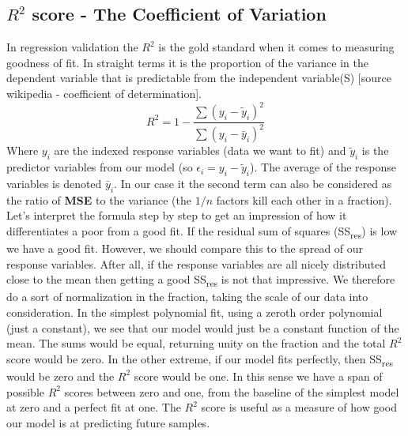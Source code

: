 \subsection{$R^2$ score - The Coefficient of Variation}
In regression validation the $R^2$ is the gold standard when it comes to measuring goodness of fit. In straight terms it is the proportion of the variance in the dependent variable that is predictable from the independent variable(S) [source wikipedia - coefficient of determination]. 
\begin{equation}\label{eq: R squared}
	R^2 = 1 - \frac{ \sum(y_i-\tilde{y}_i)^2 }{ \sum(y_i-\bar{y}_i)^2 }
\end{equation}
Where $y_i$ are the indexed response variables (data we want to fit) and $\tilde{y}_i$ is the predictor variables from our model (so $\epsilon_i = y_i - \tilde{y}_i$). The average of the response variables is denoted $\bar{y}_i$. In our case it the second term can also be considered as the ratio of \textbf{MSE} to the variance (the $1/n$ factors kill each other in a fraction). Let's interpret the formula step by step to get an impression of how it differentiates a poor from a good fit. If the residual sum of squares (SS\textsubscript{res}) is low we have a good fit. However, we should compare this to the spread of our response variables. After all, if the response variables are all nicely distributed close to the mean then getting a good SS\textsubscript{res} is not that impressive. We therefore do a sort of normalization in the fraction, taking the scale of our data into consideration. In the simplest polynomial fit, using a zeroth order polynomial (just a constant), we see that our model would just be a constant function of the mean. The sums would be equal, returning unity on the fraction and the total $R^2$ score would be zero. In the other extreme, if our model fits perfectly, then SS\textsubscript{res} would be zero and the $R^2$ score would be one. In this sense we have a span of possible $R^2$ scores between zero and one, from the baseline of the simplest model at zero and a perfect fit at one. The $R^2$ score is useful as a measure of how good our model is at predicting future samples.  
